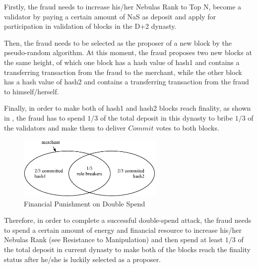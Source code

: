 Firstly, the fraud needs to increase his/her Nebulas Rank to Top N, become a validator by paying a certain amount of NaS as deposit and apply for participation in validation of blocks in the D+2 dynasty. 


Then, the fraud needs to be selected as the proposer of a new block by the pseudo-random algorithm. At this moment, the fraud proposes two new blocks at the same height, of which one block has a hash value of hash1 and contains a transferring transaction from the fraud to the merchant, while the other block has a hash value of hash2 and contains a transferring transaction from the fraud to himself/herself. 


Finally, in order to make both of hash1 and hash2 blocks reach finality, as shown in , the fraud has to spend $1/3$ of the total deposit in this dynasty to bribe $1/3$ of the validators and make them to deliver $Commit$ votes to both blocks.


\begin{figure}[h]
\centering
\includegraphics[width=7cm]{./figs/overlap}
\caption{Financial Punishment on Double Spend}
\label{fig:double_spend}
\end{figure}

Therefore, in order to complete a successful double-spend attack, the fraud needs to spend a certain amount of energy and financial resource to increase his/her Nebulas Rank (see  Resistance to Manipulation) and then spend at least $1/3$ of the total deposit in current dynasty to make both of the blocks reach the finality status after he/she is luckily selected as a proposer.

